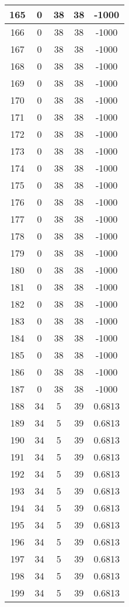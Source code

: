 \documentclass[letterpaper, 12pt]{article}
\begin{document}
\begin{longtable}{|c|c|c|c|c|}
\hline
165 & 0 & 38 & 38 & -1000 \\
\hline
166 & 0 & 38 & 38 & -1000 \\
\hline
167 & 0 & 38 & 38 & -1000 \\
\hline
168 & 0 & 38 & 38 & -1000 \\
\hline
169 & 0 & 38 & 38 & -1000 \\
\hline
170 & 0 & 38 & 38 & -1000 \\
\hline
171 & 0 & 38 & 38 & -1000 \\
\hline
172 & 0 & 38 & 38 & -1000 \\
\hline
173 & 0 & 38 & 38 & -1000 \\
\hline
174 & 0 & 38 & 38 & -1000 \\
\hline
175 & 0 & 38 & 38 & -1000 \\
\hline
176 & 0 & 38 & 38 & -1000 \\
\hline
177 & 0 & 38 & 38 & -1000 \\
\hline
178 & 0 & 38 & 38 & -1000 \\
\hline
179 & 0 & 38 & 38 & -1000 \\
\hline
180 & 0 & 38 & 38 & -1000 \\
\hline
181 & 0 & 38 & 38 & -1000 \\
\hline
182 & 0 & 38 & 38 & -1000 \\
\hline
183 & 0 & 38 & 38 & -1000 \\
\hline
184 & 0 & 38 & 38 & -1000 \\
\hline
185 & 0 & 38 & 38 & -1000 \\
\hline
186 & 0 & 38 & 38 & -1000 \\
\hline
187 & 0 & 38 & 38 & -1000 \\
\hline
188 & 34 & 5 & 39 & 0.6813 \\
\hline
189 & 34 & 5 & 39 & 0.6813 \\
\hline
190 & 34 & 5 & 39 & 0.6813 \\
\hline
191 & 34 & 5 & 39 & 0.6813 \\
\hline
192 & 34 & 5 & 39 & 0.6813 \\
\hline
193 & 34 & 5 & 39 & 0.6813 \\
\hline
194 & 34 & 5 & 39 & 0.6813 \\
\hline
195 & 34 & 5 & 39 & 0.6813 \\
\hline
196 & 34 & 5 & 39 & 0.6813 \\
\hline
197 & 34 & 5 & 39 & 0.6813 \\
\hline
198 & 34 & 5 & 39 & 0.6813 \\
\hline
199 & 34 & 5 & 39 & 0.6813 \\
\hline
\end{longtable}
\end{document}
